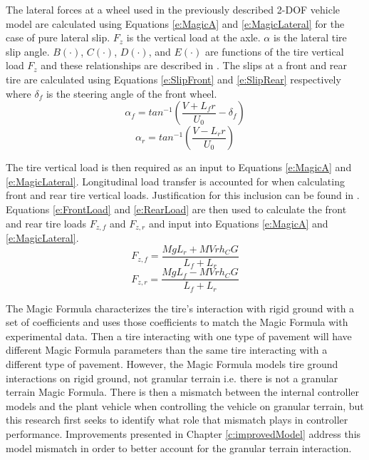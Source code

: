 \documentclass[12pt,onecolumn]{report}
\begin{document}
The lateral forces at a wheel used in the previously described 2-DOF vehicle model are calculated using Equations \ref{e:MagicA} and \ref{e:MagicLateral} for the case of pure lateral slip.  $F_{z}$ is the vertical load at the axle. $\alpha$ is the lateral tire slip angle. $B\left(\cdot\right)$, $C\left(\cdot\right)$, $D\left(\cdot\right)$, and $E\left(\cdot\right)$ are functions of the tire vertical load $F_{z}$ and these relationships are described in \cite{Pacejka2012}. The slips at a front and rear tire are calculated using Equations \ref{e:SlipFront} and \ref{e:SlipRear} respectively where $\delta_f$ is the steering angle of the front wheel.
%
\begin{equation}\label{e:SlipFront}
\alpha_f = tan^{-1}\left( \frac{V+L_{f}r}{U_0} - \delta_f\right) 
\end{equation}
\begin{equation}\label{e:SlipRear}
\alpha_r = tan^{-1}\left( \frac{V-L_{r}r}{U_0}\right)
\end{equation}

The tire vertical load is then required as an input to Equations \ref{e:MagicA} and \ref{e:MagicLateral}. Longitudinal load transfer is accounted for when calculating front and rear tire vertical loads. Justification for this inclusion can be found in \cite{ModelFidelity2016}. Equations \ref{e:FrontLoad} and \ref{e:RearLoad} are then used to calculate the front and rear tire loads $F_{z,f}$ and $F_{z,r}$ and input into Equations \ref{e:MagicA} and \ref{e:MagicLateral}.
%
\begin{equation}\label{e:FrontLoad}
F_{z,f}= \frac{MgL_r + MVrh_CG}{L_f+L_r} 
\end{equation}
\begin{equation}\label{e:RearLoad}
F_{z,r}= \frac{MgL_f - MVrh_CG}{L_f+L_r} 
\end{equation}

The Magic Formula characterizes the tire's interaction with rigid ground with a set of coefficients and uses those coefficients to match the Magic Formula with experimental data. Then a tire interacting with one type of pavement will have different Magic Formula parameters than the same tire interacting with a different type of pavement. However, the Magic Formula models tire ground interactions on rigid ground, not granular terrain i.e. there is not a granular terrain Magic Formula. There is then a mismatch between the internal controller models and the plant vehicle when controlling the vehicle on granular terrain, but this research first seeks to identify what role that mismatch plays in controller performance. Improvements presented in Chapter \ref{c:improvedModel} address this model mismatch in order to better account for the granular terrain interaction.
\end{document}

